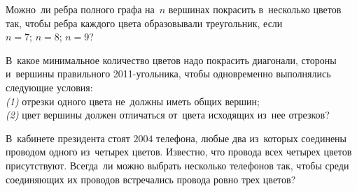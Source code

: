 \begin{problems}
\item
Можно~ли ребра полного графа на~$n$ вершинах покрасить в~несколько цветов так,
чтобы ребра каждого цвета образовывали треугольник, если
\\
\subproblem $n = 7$;
\quad
\subproblem $n = 8$;
\quad
\subproblem $n = 9$?

\item
В~какое минимальное количество цветов надо покрасить диагонали, стороны
и~вершины правильного 2011-угольника, чтобы одновременно выполнялись следующие
условия:
\\
\emph{(1)} отрезки одного цвета не~должны иметь общих вершин;
\\
\emph{(2)} цвет вершины должен отличаться от~цвета исходящих из~нее отрезков?

\item
В~кабинете президента стоят $2004$ телефона, любые два из~которых соединены
проводом одного из~четырех цветов.
Известно, что провода всех четырех цветов присутствуют.
Всегда~ли можно выбрать несколько телефонов так, чтобы среди соединяющих их
проводов встречались провода ровно трех цветов?

\end{problems}

